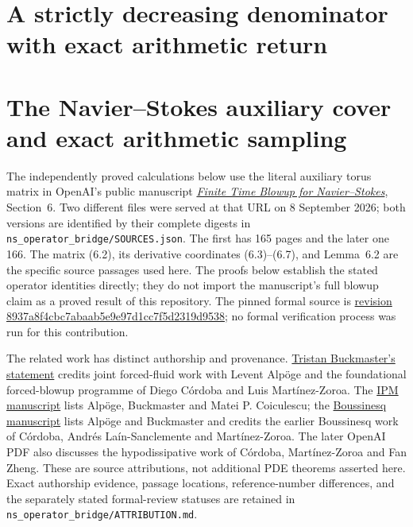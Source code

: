 \documentclass[11pt]{article}
\theoremstyle{definition}\newtheorem{definition}[theorem]{Definition}
\theoremstyle{remark}\newtheorem{remark}[theorem]{Remark}
\begin{document}
\section{A strictly decreasing denominator with exact arithmetic return}


\section{The Navier--Stokes auxiliary cover and exact arithmetic sampling}

The independently proved calculations below use the literal auxiliary
torus matrix in OpenAI's public manuscript
\href{https://cdn.openai.com/pdf/32d9f210-8b73-45e0-91bc-82a30aef8a9a/navier-stokes.pdf}
{\emph{Finite Time Blowup for Navier--Stokes}}, Section~6.
Two different files were served at that URL on 8 September 2026;
both versions are identified by their complete digests in
\texttt{ns\_operator\_bridge/SOURCES.json}. The first has 165 pages
and the later one 166. The matrix (6.2), its derivative coordinates
(6.3)--(6.7), and Lemma~6.2 are the specific source passages used
here. The proofs below establish the stated operator identities
directly; they do not import the manuscript's full blowup claim as a
proved result of this repository. The pinned formal source is
\href{https://github.com/openai/NavierStokesAndEuler/tree/8937a8f4cbc7abaab5e9e97d1cc7f5d2319d9538}
{revision 8937a8f4cbc7abaab5e9e97d1cc7f5d2319d9538}; no formal
verification process was run for this contribution.

The related work has distinct authorship and provenance.
\href{https://cims.nyu.edu/~tristanb/statement.pdf}{Tristan Buckmaster's statement}
credits joint forced-fluid work with Levent Alp\"oge and the
foundational forced-blowup programme of Diego C\'ordoba and
Luis Mart\'inez-Zoroa. The
\href{https://cims.nyu.edu/~tristanb/ipm.pdf}{IPM manuscript}
lists Alp\"oge, Buckmaster and Matei P. Coiculescu; the
\href{https://cims.nyu.edu/~tristanb/boussinesq.pdf}{Boussinesq manuscript}
lists Alp\"oge and Buckmaster and credits the earlier Boussinesq
work of C\'ordoba, Andr\'es La\'in-Sanclemente and Mart\'inez-Zoroa.
The later OpenAI PDF also discusses the hypodissipative work of
C\'ordoba, Mart\'inez-Zoroa and Fan Zheng. These are source
attributions, not additional PDE theorems asserted here. Exact
authorship evidence, passage locations, reference-number differences,
and the separately stated formal-review statuses are retained in
\texttt{ns\_operator\_bridge/ATTRIBUTION.md}.
\end{document}
